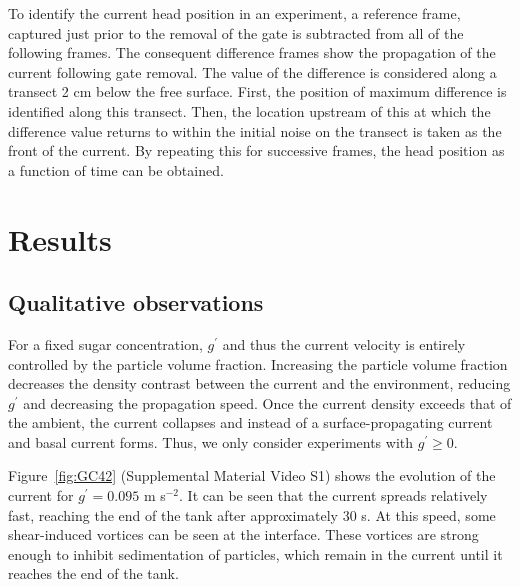\documentclass[authoryear,preprint,review,12pt]{elsarticle}
\begin{document}
To identify the current head position in an experiment, a reference frame, captured just prior to the removal of the gate is subtracted from all of the following frames. The consequent difference frames show the propagation of the current following gate removal. The value of the difference is considered along a transect 2 cm below the free surface. First, the position of maximum difference is identified along this transect. Then, the location upstream of this at which the difference value returns to within the initial noise on the transect is taken as the front of the current. By repeating this for successive frames, the head position as a function of time can be obtained. 

\section{Results}
\label{sec:res}

\subsection{Qualitative observations}
\label{subsec:qual}

For a fixed sugar concentration, $g^{\prime}$ and thus the current velocity is entirely controlled by the particle volume fraction. Increasing the particle volume fraction decreases the density contrast between the current and the environment, reducing $g^{\prime}$ and decreasing the propagation speed. Once the current density exceeds that of the ambient, the current collapses and instead of a surface-propagating current and basal current forms. Thus, we only consider experiments with $g^{\prime} \geq 0$. 

Figure~\ref{fig:GC42} (Supplemental Material Video S1) shows the evolution of the current for $g^{\prime} = 0.095$ m s$^{-2}$. It can be seen that the current spreads relatively fast, reaching the end of the tank after approximately 30 s. At this speed, some shear-induced vortices can be seen at the interface. These vortices are strong enough to inhibit sedimentation of particles, which remain in the current until it reaches the end of the tank. 
\end{document}
